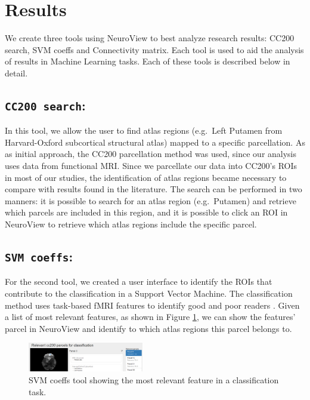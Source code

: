 \documentclass[twocolumn]{bmcart}%
\begin{document}
\section{Results}\label{results}

We create three tools using NeuroView to best analyze research results:
CC200 search, SVM coeffs and Connectivity matrix. Each tool is used to
aid the analysis of results in Machine Learning tasks. Each of these
tools is described below in detail.

\subsection{\texorpdfstring{\texttt{CC200 search}:}{:}}\label{section}

In this tool, we allow the user to find atlas regions (e.g.~Left Putamen
from Harvard-Oxford subcortical structural atlas) mapped to a specific
parcellation. As as initial approach, the CC200 \cite{Craddock2012}
parcellation method was used, since our analysis uses data from
functional MRI. Since we parcellate our data into CC200's ROIs in most
of our studies, the identification of atlas regions became necessary to
compare with results found in the literature. The search can be
performed in two manners: it is possible to search for an atlas region
(e.g.~Putamen) and retrieve which parcels are included in this region,
and it is possible to click an ROI in NeuroView to retrieve which atlas
regions include the specific parcel.

\subsection{\texorpdfstring{\texttt{SVM coeffs}:}{:}}\label{section-1}

For the second tool, we created a user interface to identify the ROIs
that contribute to the classification in a Support Vector Machine. The
classification method uses task-based fMRI features to identify good and
poor readers \cite{Salles2013}. Given a list of most relevant features,
as shown in Figure \ref{fig:svm_coeffs}, we can show the features'
parcel in NeuroView and identify to which atlas regions this parcel
belongs to.

\begin{figure}[ht]
\centering
\includegraphics[width=0.45\textwidth]{figs/svm_coeffs.png}
\caption{SVM coeffs tool showing the most relevant feature in a classification task.}
\label{fig:svm_coeffs}
\end{figure}
\end{document}
